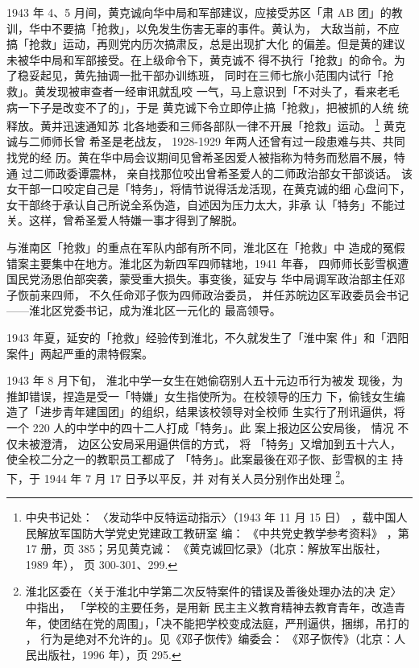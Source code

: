 1943 年 4、5 月间，黄克诚向华中局和军部建议，应接受苏区「肃 AB 团」的教
训，华中不要搞「抢救」，以免发生伤害无辜的事件。黄认为， 大敌当前，不应
搞「抢救」运动，再则党内历次搞肃反，总是出现扩大化 的偏差。但是黄的建议
未被华中局和军部接受。在上级命令下，黄克诚不 得不执行「抢救」的命令。为
了稳妥起见，黄先抽调一批干部办训练班， 同时在三师七旅小范围内试行「抢
救」。黄发现被审查者一经审讯就乱咬 一气，马上意识到「不对头了，看来老毛
病一下子是改变不了的」，于是 黄克诚下令立即停止搞「抢救」，把被抓的人统
统释放。黄并迅速通知苏 北各地委和三师各部队一律不开展「抢救」运动。
\footnote{中央书记处： 〈发动华中反特运动指示〉（1943 年 11 月 15 日）
，载中国人民解放军国防大学党史党建政工教研室 编： 《中共党史教学参考资料》
，第 17 册，页 385；另见黄克诚： 《黄克诚回忆录》（北京：解放军出版社，
1989 年）， 页 300-301、299.} 黄克诚与二师师长曾 希圣是老战友，
1928-1929 年两人还曾有过一段患难与共、共同找党的经
历。黄在华中局会议期间见曾希圣因爱人被指称为特务而愁眉不展，特通
过二师政委谭震林，
亲自找那位咬出曾希圣爱人的二师政治部女干部谈话。
该女干部一口咬定自己是「特务」，将情节说得活龙活现，在黄克诚的细
心盘问下，女干部终于承认自己所说全系伪造，自述因为压力太大，非承
认「特务」不能过关。这样，曾希圣爱人特嫌一事才得到了解脱。

与淮南区「抢救」的重点在军队内部有所不同，淮北区在「抢救」中
造成的冤假错案主要集中在地方。淮北区为新四军四师辖地，1941 年春，
四师师长彭雪枫遭国民党汤恩伯部突袭，蒙受重大损失。事变後，延安与
华中局调军政治部主任邓子恢前来四师，
不久任命邓子恢为四师政治委员，
并任苏皖边区军政委员会书记——淮北区党委书记，成为淮北区一元化的
最高领导。

1943 年夏，延安的「抢救」经验传到淮北，不久就发生了「淮中案
件」和「泗阳案件」两起严重的肃特假案。

1943 年 8 月下旬， 淮北中学一女生在她偷窃别人五十元边币行为被发 现後，为
推卸错误，捏造是受一「特嫌」女生指使所为。在校领导的压力 下，偷钱女生编
造了「进步青年建国团」的组织，结果该校领导对全校师 生实行了刑讯逼供，将
一个 220 人的中学中的四十二人打成「特务」。此 案上报边区公安局後， 情况
不仅未被澄清， 边区公安局采用逼供信的方式， 将 「特务」又增加到五十六人，
使全校二分之一的教职员工都成了 「特务」。此案最後在邓子恢、彭雪枫的主
持下，于 1944 年 7 月 17 日予以平反，并 对有关人员分别作出处理
\footnote{淮北区委在〈关于淮北中学第二次反特案件的错误及善後处理办法的决
定〉中指出， 「学校的主要任务，是用新 民主主义教育精神去教育青年，改造青
年，使团结在党的周围」，「决不能把学校变成法庭，严刑逼供，捆绑，吊打的
， 行为是绝对不允许的」。见《邓子恢传》编委会： 《邓子恢传》（北京：人
民出版社，1996 年），页 295.  }。

